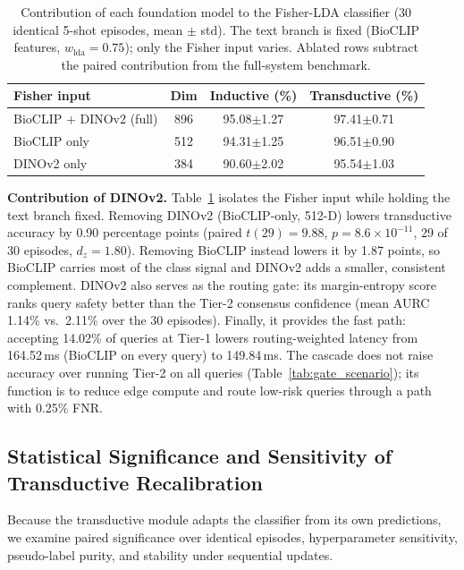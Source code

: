 \documentclass[preprint,12pt]{elsarticle}
\begin{document}
\begin{table}[htbp]
\centering
\caption{Contribution of each foundation model to the Fisher-LDA classifier (30 identical 5-shot episodes, mean $\pm$ std). The text branch is fixed (BioCLIP features, $w_{\mathrm{lda}}=0.75$); only the Fisher input varies. Ablated rows subtract the paired contribution from the full-system benchmark.}
\label{tab:feature_ablation}
\footnotesize
\setlength{\tabcolsep}{4pt}
\begin{tabular*}{\columnwidth}{@{\extracolsep{\fill}}lccc}
\toprule
\textbf{Fisher input} & \textbf{Dim} & \textbf{Inductive (\%)} & \textbf{Transductive (\%)} \\
\midrule
BioCLIP + DINOv2 (full) & 896 & 95.08$\pm$1.27 & 97.41$\pm$0.71 \\
BioCLIP only & 512 & 94.31$\pm$1.25 & 96.51$\pm$0.90 \\
DINOv2 only & 384 & 90.60$\pm$2.02 & 95.54$\pm$1.03 \\
\bottomrule
\end{tabular*}
\end{table}

\textbf{Contribution of DINOv2.} Table~\ref{tab:feature_ablation} isolates the Fisher input while holding the text branch fixed. Removing DINOv2 (BioCLIP-only, 512-D) lowers transductive accuracy by 0.90 percentage points (paired $t(29)=9.88$, $p=8.6\times10^{-11}$, 29 of 30 episodes, $d_z=1.80$). Removing BioCLIP instead lowers it by 1.87 points, so BioCLIP carries most of the class signal and DINOv2 adds a smaller, consistent complement. DINOv2 also serves as the routing gate: its margin-entropy score ranks query safety better than the Tier-2 consensus confidence (mean AURC 1.14\% vs.\ 2.11\% over the 30 episodes). Finally, it provides the fast path: accepting 14.02\% of queries at Tier-1 lowers routing-weighted latency from 164.52\,ms (BioCLIP on every query) to 149.84\,ms. The cascade does not raise accuracy over running Tier-2 on all queries (Table~\ref{tab:gate_scenario}); its function is to reduce edge compute and route low-risk queries through a path with 0.25\% FNR.

\subsection{Statistical Significance and Sensitivity of Transductive Recalibration}
\label{sec:transductive_validation}
Because the transductive module adapts the classifier from its own predictions, we examine paired significance over identical episodes, hyperparameter sensitivity, pseudo-label purity, and stability under sequential updates.
\end{document}
